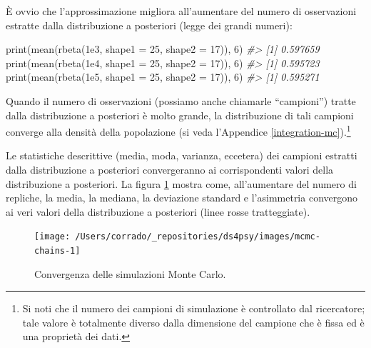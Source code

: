 \documentclass[
  11pt,
]{krantz}
\makeatletter
\newenvironment{Shaded}{\begin{snugshade}}{\end{snugshade}}
\newcommand{\AttributeTok}[1]{\textcolor[rgb]{0.61,0.61,0.61}{#1}}
\newcommand{\CommentTok}[1]{\textcolor[rgb]{0.37,0.37,0.37}{\textit{#1}}}
\newcommand{\DecValTok}[1]{\textcolor[rgb]{0.06,0.06,0.06}{#1}}
\newcommand{\FloatTok}[1]{\textcolor[rgb]{0.06,0.06,0.06}{#1}}
\newcommand{\FunctionTok}[1]{\textcolor[rgb]{0,0,0}{#1}}
\newcommand{\NormalTok}[1]{#1}
\newenvironment{kframe}{%
\medskip{}
\setlength{\fboxsep}{.8em}
 \def\at@end@of@kframe{}%
 \ifinner\ifhmode%
  \def\at@end@of@kframe{\end{minipage}}%
  \begin{minipage}{\columnwidth}%
 \fi\fi%
 \def\FrameCommand##1{\hskip\@totalleftmargin \hskip-\fboxsep
 \colorbox{shadecolor}{##1}\hskip-\fboxsep
     \hskip-\linewidth \hskip-\@totalleftmargin \hskip\columnwidth}%
 \MakeFramed {\advance\hsize-\width
   \@totalleftmargin\z@ \linewidth\hsize
   \@setminipage}}%
 {\par\unskip\endMakeFramed%
 \at@end@of@kframe}
\renewenvironment{Shaded}{\begin{kframe}}{\end{kframe}}
\theoremstyle{definition}
\theoremstyle{definition}
\theoremstyle{definition}
\theoremstyle{definition}
\theoremstyle{remark}
\makeatother
\begin{document}
È ovvio che l'approssimazione migliora all'aumentare del numero di osservazioni estratte dalla distribuzione a posteriori (legge dei grandi numeri):

\begin{Shaded}
\begin{Highlighting}[]
\FunctionTok{print}\NormalTok{(}\FunctionTok{mean}\NormalTok{(}\FunctionTok{rbeta}\NormalTok{(}\FloatTok{1e3}\NormalTok{, }\AttributeTok{shape1 =} \DecValTok{25}\NormalTok{, }\AttributeTok{shape2 =} \DecValTok{17}\NormalTok{)), }\DecValTok{6}\NormalTok{)}
\CommentTok{\#\textgreater{} [1] 0.597659}
\FunctionTok{print}\NormalTok{(}\FunctionTok{mean}\NormalTok{(}\FunctionTok{rbeta}\NormalTok{(}\FloatTok{1e4}\NormalTok{, }\AttributeTok{shape1 =} \DecValTok{25}\NormalTok{, }\AttributeTok{shape2 =} \DecValTok{17}\NormalTok{)), }\DecValTok{6}\NormalTok{)}
\CommentTok{\#\textgreater{} [1] 0.595723}
\FunctionTok{print}\NormalTok{(}\FunctionTok{mean}\NormalTok{(}\FunctionTok{rbeta}\NormalTok{(}\FloatTok{1e5}\NormalTok{, }\AttributeTok{shape1 =} \DecValTok{25}\NormalTok{, }\AttributeTok{shape2 =} \DecValTok{17}\NormalTok{)), }\DecValTok{6}\NormalTok{)}
\CommentTok{\#\textgreater{} [1] 0.595271}
\end{Highlighting}
\end{Shaded}

Quando il numero di osservazioni (possiamo anche chiamarle ``campioni'') tratte dalla distribuzione a posteriori è molto grande, la distribuzione di tali campioni converge alla densità della popolazione (si veda l'Appendice \ref{integration-mc}).\footnote{Si noti che il numero dei campioni di simulazione è controllato dal ricercatore; tale valore è totalmente diverso dalla dimensione del campione che è fissa ed è una proprietà dei dati.}

Le statistiche descrittive (media, moda, varianza, eccetera) dei campioni estratti dalla distribuzione a posteriori convergeranno ai corrispondenti valori della distribuzione a posteriori. La figura \ref{fig:mcmc-chains-1} mostra come, all'aumentare del numero di repliche, la media, la mediana, la deviazione standard e l'asimmetria convergono ai veri valori della distribuzione a posteriori (linee rosse tratteggiate).

\begin{figure}[h]

{\centering \texttt{[image: /Users/corrado/\_repositories/ds4psy/images/mcmc-chains-1]} 

}

\caption{Convergenza delle simulazioni Monte Carlo.}\label{fig:mcmc-chains-1}
\end{figure}
\end{document}
